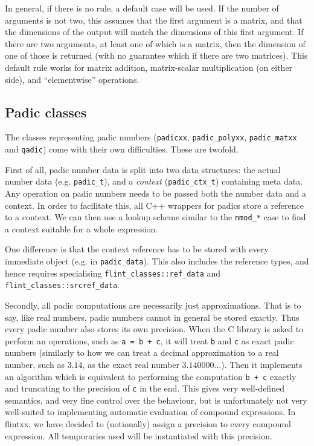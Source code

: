 \documentclass[a4paper,10pt]{book}
\newcommand{\code}{\lstinline}
\begin{document}
{{In general, if there is no rule, a default case will be used. If the number of
arguments is not two, this assumes that the first argument is a matrix, and that
the dimensions of the output will match the dimensions of this first argument.
If there are two arguments, at least one of which is a matrix, then the
dimension of one of those is returned (with no guarantee which if there are two
matrices). This default rule works for matrix addition, matrix-scalar
multiplication (on either side), and ``elementwise'' operations.

\subsection{Padic classes}

The classes representing padic numbers (\code{padicxx}, \code{padic_polyxx},
\code{padic_matxx} and \code{qadic}) come with their own difficulties. These are
twofold.

First of all, padic number data is split into two data structures: the actual
number data (e.g. \code{padic_t}), and a \emph{context} (\code{padic_ctx_t})
containing meta data.
Any operation on padic numbers needs to be passed both the number data and a
context. In order to facilitate this, all C++ wrappers for padics store a
reference to a context. We can then use a lookup scheme similar to the
\code{nmod_*} case to find a context suitable for a whole expression.

One difference is that the context reference has to be stored with every
immediate object (e.g. in \code{padic_data}). This also includes the reference
types, and hence requires specialising \code{flint_classes::ref_data} and
\code{flint_classes::srcref_data}.

Secondly, all padic computations are necessarily just approximations. That is to
say, like real numbers, padic numbers cannot in general be stored exactly. Thus
every padic number also stores its own precision. When the C library is asked to
perform an operations, such as \code{a = b + c}, it will treat \code{b} and
\code{c} as exact padic numbers (similarly to how we can treat a decimal
approximation to a real number, such as $3.14$, as the exact real number
$3.140000\dots$). Then it implements an algorithm which is equivalent to
performing the computation \code{b + c} exactly and truncating to the precision
of \code{c} in the end. This gives very well-defined semantics, and very fine
control over the behaviour, but is unfortunately not very well-suited to
implementing automatic evaluation of compound expressions. In flintxx, we have
decided to (notionally) assign a precision to every compound expression. All
temporaries used will be instantiated with this precision.

}}
\end{document}

